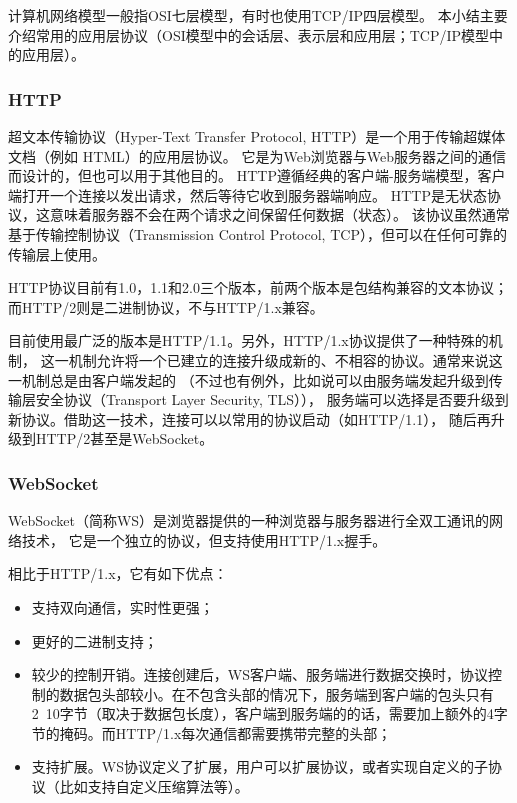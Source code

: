 计算机网络模型一般指OSI七层模型，有时也使用TCP/IP四层模型。
本小结主要介绍常用的应用层协议（OSI模型中的会话层、表示层和应用层；TCP/IP模型中的应用层）。

\subsubsection{HTTP}

超文本传输协议（Hyper-Text Transfer Protocol, HTTP）是一个用于传输超媒体文档（例如 HTML）的应用层协议。
它是为Web浏览器与Web服务器之间的通信而设计的，但也可以用于其他目的。
HTTP遵循经典的客户端-服务端模型，客户端打开一个连接以发出请求，然后等待它收到服务器端响应。
HTTP是无状态协议，这意味着服务器不会在两个请求之间保留任何数据（状态）。
该协议虽然通常基于传输控制协议（Transmission Control Protocol, TCP），但可以在任何可靠的传输层上使用。

HTTP协议目前有1.0，1.1和2.0三个版本，前两个版本是包结构兼容的文本协议；而HTTP/2则是二进制协议，不与HTTP/1.x兼容。

目前使用最广泛的版本是HTTP/1.1。另外，HTTP/1.x协议提供了一种特殊的机制，
这一机制允许将一个已建立的连接升级成新的、不相容的协议。通常来说这一机制总是由客户端发起的
（不过也有例外，比如说可以由服务端发起升级到传输层安全协议（Transport Layer Security, TLS）），
服务端可以选择是否要升级到新协议。借助这一技术，连接可以以常用的协议启动（如HTTP/1.1），
随后再升级到HTTP/2甚至是WebSocket。

\subsubsection{WebSocket}

WebSocket（简称WS）是浏览器提供的一种浏览器与服务器进行全双工通讯的网络技术，
它是一个独立的协议，但支持使用HTTP/1.x握手。

相比于HTTP/1.x，它有如下优点：

\begin{itemize}
    \item 支持双向通信，实时性更强；
    \item 更好的二进制支持；
    \item 较少的控制开销。连接创建后，WS客户端、服务端进行数据交换时，协议控制的数据包头部较小。在不包含头部的情况下，服务端到客户端的包头只有2~10字节（取决于数据包长度），客户端到服务端的的话，需要加上额外的4字节的掩码。而HTTP/1.x每次通信都需要携带完整的头部；
    \item 支持扩展。WS协议定义了扩展，用户可以扩展协议，或者实现自定义的子协议（比如支持自定义压缩算法等）。
\end{itemize}

